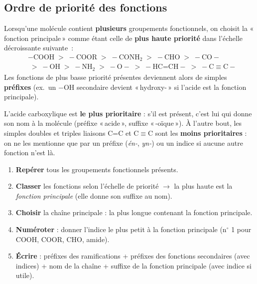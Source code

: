 \documentclass[11pt,a4paper]{article}
\begin{document}
\subsection{Ordre de priorité des fonctions}
\begin{theoreme}
Lorsqu'une molécule contient \textbf{plusieurs} groupements fonctionnels, on choisit la «\,fonction principale\,» comme étant celle de \textbf{plus haute priorité} dans l'échelle décroissante suivante~:
\[
\boxed{\;\begin{aligned}
& -\text{COOH} \;>\; -\text{COOR} \;>\; -\text{CONH}_2 \;>\; -\text{CHO} \;>\; -\text{CO}- \\[2pt]
& \;>\; -\text{OH} \;>\; -\text{NH}_2 \;>\; -\text{O}- \;>\; -\text{HC=CH}- \;>\; -\text{C}\equiv\text{C}-
\end{aligned}\;}
\]
Les fonctions de plus basse priorité présentes deviennent alors de simples \textbf{préfixes} (ex.\ un $-\text{OH}$ secondaire devient «\,hydroxy-\,» si l'acide est la fonction principale).
\end{theoreme}

\begin{remarque}
L'acide carboxylique est \textbf{le plus prioritaire} : s'il est présent, c'est lui qui donne son nom à la molécule (préfixe «\,acide\,», suffixe «\,-oïque\,»). À l'autre bout, les simples doubles et triples liaisons C=C et C$\equiv$C sont les \textbf{moins prioritaires} : on ne les mentionne que par un préfixe (\textit{én-}, \textit{yn-}) ou un indice si aucune autre fonction n'est là.
\end{remarque}

\begin{methode}
\hfill
\begin{enumerate}[leftmargin=1.6em,itemsep=1pt]
  \item \textbf{Repérer} tous les groupements fonctionnels présents.
  \item \textbf{Classer} les fonctions selon l'échelle de priorité $\rightarrow$ la plus haute est la \emph{fonction principale} (elle donne son suffixe au nom).
  \item \textbf{Choisir} la chaîne principale : la plus longue contenant la fonction principale.
  \item \textbf{Numéroter} : donner l'indice le plus petit à la fonction principale (n$^\circ$ 1 pour COOH, COOR, CHO, amide).
  \item \textbf{Écrire} : préfixes des ramifications + préfixes des fonctions secondaires (avec indices) + nom de la chaîne + suffixe de la fonction principale (avec indice si utile).
\end{enumerate}
\end{methode}
\end{document}
